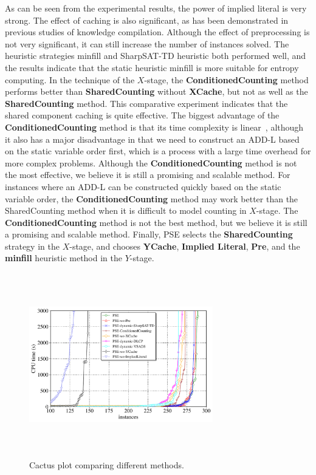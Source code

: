 As can be seen from the experimental results, the power of implied literal is very strong. 
The effect of caching is also significant, as has been demonstrated in previous studies of knowledge compilation.
Although the effect of preprocessing is not very significant, it can still increase the number of instances solved.
The heuristic strategies minfill and SharpSAT-TD heuristic both performed well, and the results indicate that the static heuristic minfill is more suitable for entropy computing.
In the technique of the $X$-stage, the \textbf{ConditionedCounting} method performs better than \textbf{SharedCounting} without \textbf{XCache}, but not as well as the \textbf{SharedCounting} method.
This comparative experiment indicates that the shared component caching is quite effective.
The biggest advantage of the \textbf{ConditionedCounting} method is that its time complexity is linear~\cite{lai2017new}, although it also has a major disadvantage in that we need to construct an ADD-L based on the static variable order first, which is a process with a large time overhead for more complex problems.
Although the \textbf{ConditionedCounting} method is not the most effective, we believe it is still a promising and scalable method. 
For instances where an ADD-L can be constructed quickly based on the static variable order, the \textbf{ConditionedCounting} method may work better than the SharedCounting method when it is difficult to model counting in $X$-stage. 
The \textbf{ConditionedCounting} method is not the best method, but we believe it is still a promising and scalable method.
Finally, PSE selects the \textbf{SharedCounting} strategy in the $X$-stage, and chooses \textbf{YCache}, \textbf{Implied Literal}, \textbf{Pre}, and the \textbf{minfill} heuristic method in the $Y$-stage.
	
\begin{figure}[htbp]
	\centering
	\includegraphics[width=8cm,height=8cm]{figures/Configuration_compare.pdf}
	\caption{Cactus plot comparing different methods.}
	\label{figure:3}
\end{figure} 


